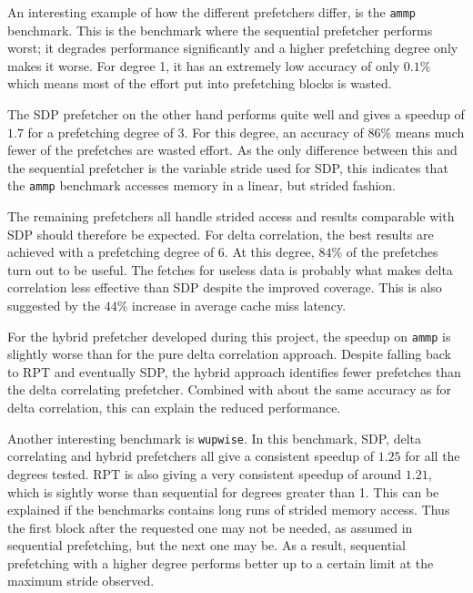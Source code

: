 An interesting example of how the different prefetchers differ, is the
\texttt{ammp} benchmark.  This is the benchmark where the sequential
prefetcher performs worst; it degrades performance significantly and a
higher prefetching degree only makes it worse.  For degree 1, it has
an extremely low accuracy of only $0.1\%$ which means most of the
effort put into prefetching blocks is wasted.

The SDP prefetcher on the other hand performs quite well and gives a speedup of
$1.7$ for a prefetching degree of $3$. For this degree, an accuracy of $86\%$
means much fewer of the prefetches are wasted effort.  As the only difference
between this and the sequential prefetcher is the variable stride used for SDP,
this indicates that the \texttt{ammp} benchmark accesses memory in a linear,
but strided fashion.

The remaining prefetchers all handle strided access and results comparable with
SDP should therefore be expected.  For delta correlation, the best results are
achieved with a prefetching degree of $6$.  At this degree, $84\%$ of the
prefetches turn out to be useful.  The fetches for useless data is probably
what makes delta correlation less effective than SDP despite the improved
coverage.
This is also suggested by the $44\%$ increase in average cache miss latency.

For the hybrid prefetcher developed during this project, the speedup on \texttt{ammp} is slightly
worse than for the pure delta correlation approach.
Despite falling back to RPT and eventually SDP, the hybrid approach identifies
fewer prefetches than the delta correlating prefetcher.
Combined with about the same accuracy as for delta correlation, this can explain
the reduced performance.

Another interesting benchmark is \texttt{wupwise}.
In this benchmark, SDP, delta correlating and hybrid prefetchers all give a
consistent speedup of $1.25$ for all the degrees tested.
RPT is also giving a very consistent speedup of around $1.21$, which is sightly
worse than sequential for degrees greater than 1.
This can be explained if the benchmarks contains long runs of strided memory
access.
Thus the first block after the requested one may not be needed, as assumed in
sequential prefetching, but the next one may be.
As a result, sequential prefetching with a higher degree performs better up to a
certain limit at the maximum stride observed.

